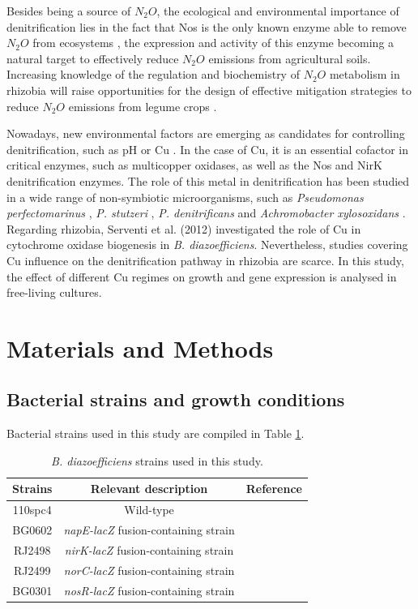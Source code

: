 \documentclass[a4paper,11pt]{article}
\begin{document}
Besides being a source of $N_2O$, the ecological and environmental importance of denitrification
lies in the fact that Nos is the only known enzyme able to remove $N_2O$ from
ecosystems \cite{richardson2009mitigating}, the expression and activity of this enzyme becoming a natural target to effectively reduce $N_2O$ emissions from agricultural soils. Increasing knowledge of the regulation
and biochemistry of $N_2O$ metabolism in rhizobia will raise opportunities for the design of effective mitigation strategies to reduce $N_2O$ emissions from legume crops \cite{bakken2017sources}.

Nowadays, new environmental factors are emerging as candidates for controlling
denitrification, such as pH \cite{carreira2020effect}\cite{olaya2021effect} or Cu \cite{black2016influence}. In the case of Cu, it is an essential cofactor in
critical enzymes, such as multicopper oxidases, as well as the Nos and NirK denitrification
enzymes. The role of this metal in denitrification has been studied in a wide range of
non-symbiotic microorganisms, such as {\em Pseudomonas perfectomarinus} \cite{matsubara1982modulation}, {\em P. stutzeri} \cite{black2016influence},
{\em P. denitrificans} \cite{felgate2012impact}\cite{sullivan2013copper} and {\em Achromobacter xylosoxidans} \cite{felgate2012impact}. Regarding rhizobia, Serventi et al.
(2012) \cite{serventi2012copper} investigated the role of Cu in cytochrome oxidase biogenesis in {\em B. diazoefficiens}.
Nevertheless, studies covering Cu influence on the denitrification pathway in rhizobia are
scarce. In this study, the effect of different Cu regimes on growth and gene expression is analysed in free-living cultures.

\section{Materials and Methods}
\subsection{Bacterial strains and growth conditions}
Bacterial strains used in this study are compiled in Table \ref{tab:table1}. 

\begin{table}[h!]
\centering
\caption{{\em B. diazoefficiens} strains used in this study.}
\begin{tabular}{|c|c|c|}
\hline
\textbf{Strains} & \textbf{Relevant description} & \textbf{Reference} \\
\hline
110spc4 & Wild-type & \cite{regensburger1983rna} \\
\hline
BG0602 & {\em napE-lacZ} fusion-containing strain & \cite{robles2006bradyrhizobium} \\
\hline
RJ2498 & {\em nirK-lacZ} fusion-containing strain & \cite{mesa2003bradyrhizobium} \\
\hline
RJ2499 & {\em norC-lacZ} fusion-containing strain & \cite{mesa2003bradyrhizobium} \\
\hline
BG0301 & {\em nosR-lacZ} fusion-containing strain & \cite{torres2017fixk2}\\
\hline
\end{tabular}
\label{tab:table1}
\end{table}
\end{document}

